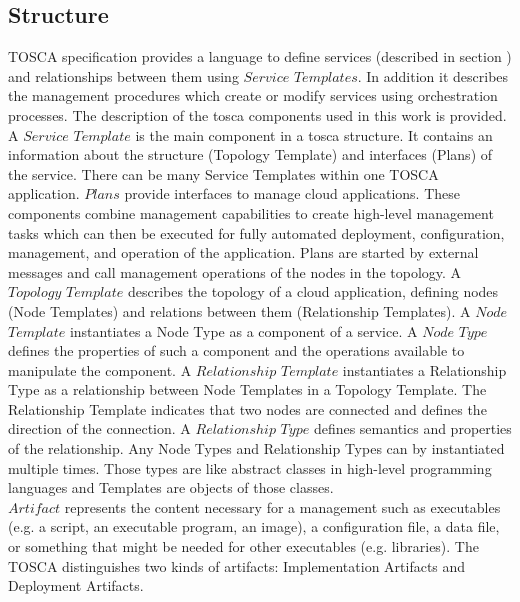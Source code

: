 \subsection*{Structure}
TOSCA specification provides a language to define services (described in section ) and relationships between them using $Service$ $Templates$. 
In addition it describes the management procedures which create or modify services using orchestration processes.
The description of the \gls{tosca} components used in this work is provided. \\
A $Service$ $Template$ is the main component in a \gls{tosca} structure. 
It contains an information about the structure (Topology Template) and interfaces (Plans) of the service. 
There can be many Service Templates within one TOSCA application. %
$Plans$ provide interfaces to manage cloud applications.
These components combine management capabilities to create high-level management tasks which can then be executed for fully automated deployment, configuration, management, and operation of the application.
Plans are started by external messages and call management operations of the nodes in the topology. %
A $Topology$ $Template$ describes the topology of a cloud application, defining nodes (Node Templates) and relations between them (Relationship Templates). %
A $Node$ $Template$ instantiates a Node Type as a component of a service. 
A $Node$ $Type$ defines the properties of such a component and the operations available to manipulate the component.
A $Relationship$ $Template$ instantiates a Relationship Type as a relationship between Node Templates in a Topology Template. 
The Relationship Template indicates that two nodes are connected and defines the direction of the connection.
A $Relationship$ $Type$ defines semantics and properties of the relationship.\label{subs:reltype} %
Any Node Types and Relationship Types can by instantiated multiple times.
Those types are like abstract classes in high-level programming languages and Templates are objects of those classes.\\
$Artifact$ represents the content necessary for a management such as executables (e.g. a script, an executable program, an image), a configuration file, a data file, or something that might be needed for other executables (e.g. libraries).
The TOSCA distinguishes two kinds of artifacts: Implementation Artifacts and Deployment Artifacts.
